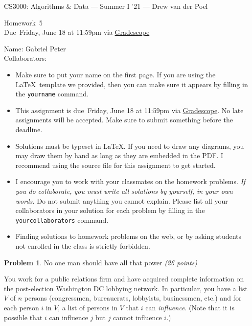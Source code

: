 \documentclass[11pt]{article}
\newcommand{\yourname}{Gabriel Peter}
\newcommand{\yourcollaborators}{}
\theoremstyle{definition}
\newcommand{\instructor}{Drew van der Poel}
\newcommand{\hwnum}{5}
\newcommand{\hwdue}{Friday, June 18 at 11:59pm via \href{https://gradescope.com/courses/266585}{Gradescope}}
\theoremstyle{theorem}
\newtheorem{prob}{Problem}
\begin{document}
{\Large 
\begin{center}{CS3000: Algorithms \& Data} --- Summer I '21 --- \instructor \end{center}}
{\large
\vspace{10pt}
\noindent Homework~\hwnum \vspace{2pt}\\
Due~\hwdue}

\bigskip
{\large
\noindent Name: \yourname \vspace{2pt}\\ Collaborators: \yourcollaborators}

\vspace{15pt}
\begin{itemize}

\item Make sure to put your name on the first page.  If you are using the \LaTeX~template we provided, then you can make sure it appears by filling in the \texttt{yourname} command.

\item This assignment is due~\hwdue.  No late assignments will be accepted.  Make sure to submit something before the deadline.

\item Solutions must be typeset in \LaTeX.  If you need to draw any diagrams, you may draw them by hand as long as they are embedded in the PDF.  I recommend using the source file for this assignment to get started.

\item I encourage you to work with your classmates on the homework problems. \emph{If you do collaborate, you must write all solutions by yourself, in your own words.}  Do not submit anything you cannot explain.  Please list all your collaborators in your solution for each problem by filling in the \texttt{yourcollaborators} command.

\item Finding solutions to homework problems on the web, or by asking students not enrolled in the class is strictly forbidden.

\end{itemize}

\newpage

\begin{prob} No one man should have all that power \emph{(26 points)}\end{prob}

You work for a public relations firm and have acquired complete
information on the post-election Washington DC lobbying network.  In
particular, you have a list $V$ of $n$ persons (congressmen,
bureaucrats, lobbyists, businessmen, etc.) and for each person $i$ in
$V$, a list of persons in $V$ that $i$ can {\em influence}.  (Note
that it is possible that $i$ can influence $j$ but $j$ cannot
influence $i$.)
\end{document}
